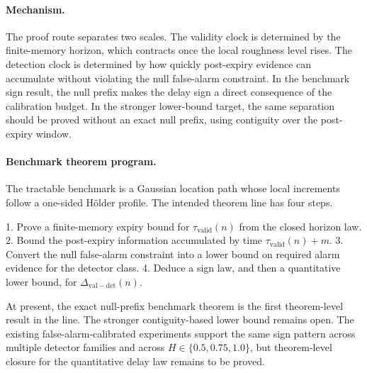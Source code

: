 \paragraph{Mechanism.}
The proof route separates two scales. The validity clock is determined by the
finite-memory horizon, which contracts once the local roughness level rises. The
detection clock is determined by how quickly post-expiry evidence can accumulate
without violating the null false-alarm constraint. In the benchmark sign result,
the null prefix makes the delay sign a direct consequence of the calibration
budget. In the stronger lower-bound target, the same separation should be proved
without an exact null prefix, using contiguity over the post-expiry window.

\paragraph{Benchmark theorem program.}
The tractable benchmark is a Gaussian location path whose local increments follow
a one-sided H\"older profile. The intended theorem line has four steps.

1. Prove a finite-memory expiry bound for $\tau_{\mathrm{valid}}(n)$ from the
   closed horizon law.
2. Bound the post-expiry information accumulated by time
   $\tau_{\mathrm{valid}}(n)+m$.
3. Convert the null false-alarm constraint into a lower bound on required alarm
   evidence for the detector class.
4. Deduce a sign law, and then a quantitative lower bound, for
   $\Delta_{\mathrm{val-det}}(n)$.

At present, the exact null-prefix benchmark theorem is the first theorem-level
result in the line. The stronger contiguity-based lower bound remains open. The
existing false-alarm-calibrated experiments support the same sign pattern across
multiple detector families and across $H\in\{0.5,0.75,1.0\}$, but theorem-level
closure for the quantitative delay law remains to be proved.
